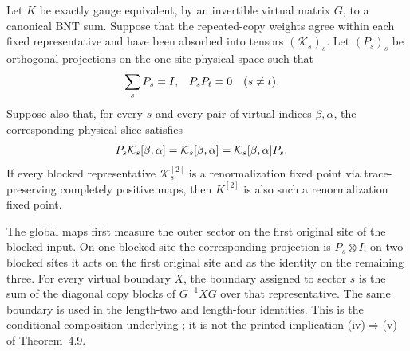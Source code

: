\begin{lemma}
    Let $K$ be exactly gauge equivalent, by an invertible virtual matrix $G$,
    to a canonical BNT sum. Suppose that the repeated-copy weights agree
    within each fixed representative and have been absorbed into tensors
    $(\mathcal K_s)_s$. Let $(P_s)_s$ be orthogonal projections on the
    one-site physical space such that
    \begin{align}
        \sum_s P_s & =I, & P_sP_t & =0\quad(s\ne t).
        \notag
    \end{align}
    Suppose also that, for every $s$ and every pair of virtual indices
    $\beta,\alpha$, the corresponding physical slice satisfies
    \begin{align}
        P_s\mathcal K_s[\beta,\alpha]
         & =\mathcal K_s[\beta,\alpha]
        =\mathcal K_s[\beta,\alpha]P_s .
        \notag
    \end{align}
    If every blocked representative $\mathcal K_s^{[2]}$ is a
    renormalization fixed point via trace-preserving completely positive maps,
    then $K^{[2]}$ is also such a renormalization fixed point.

    The global maps first measure the outer sector on the first original site
    of the blocked input. On one blocked site the corresponding projection is
    $P_s\otimes I$; on two blocked sites it acts on the first original site
    and as the identity on the remaining three. For every virtual boundary
    $X$, the boundary assigned to sector $s$ is the sum of the diagonal copy
    blocks of $G^{-1}XG$ over that representative. The same boundary is used
    in the length-two and length-four identities. This is the conditional
    composition underlying \cite[Appendix~C.2, lines~1646--1665 and
        1810--1825]{Cirac2016MPDO_arXiv}; it is not the printed implication
    (iv)$\Rightarrow$(v) of Theorem~4.9.
\end{lemma}


